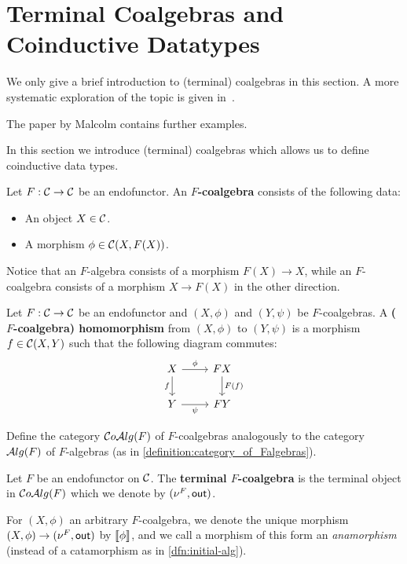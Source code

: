 \chapter{Terminal Coalgebras and Coinductive Datatypes}\label{sec:coinductive}


\begin{reading*}
  We only give a brief introduction to (terminal) coalgebras in this section.
  A more systematic exploration of the topic is given in~\cite{DBLP:conf/fpca/MeijerFP91}.

  The paper \cite{DBLP:journals/scp/Malcolm90} by Malcolm contains further examples.
\end{reading*}


In this section we introduce (terminal) coalgebras which allows us to define coinductive data types.

\begin{dfn} Let $F:\mathcal{C}\to \mathcal{C}$ be an endofunctor. An \textbf{$F$-coalgebra} consists of the following data:
\begin{itemize}
\item An object $X\in \mathcal{C}$.
\item A morphism $\phi \in {\mathcal{C}}(X,F(X))$.
\end{itemize}
\end{dfn}
Notice that an $F$-algebra consists of a morphism $F(X)\to X$, while an $F$-coalgebra consists of a morphism $X\to F(X)$ in the other direction.

\begin{dfn} Let $F:\mathcal{C}\to \mathcal{C}$ be an endofunctor and $(X,\phi)$ and $(Y,\psi)$ be $F$-coalgebras. A \textbf{($F$-coalgebra) homomorphism} from $(X,\phi)$ to $(Y,\psi)$ is a morphism $f\in {\mathcal{C}}(X,Y)$ such that the following diagram commutes:
\[
\begin{tikzcd}
X
\arrow[r, "\phi"] 
\arrow[d,swap, "f"]
& FX
\arrow[d, "F(f)"] 
\\
Y
\arrow[r, swap, "\psi"] 
& FY
\end{tikzcd}
\]
\end{dfn}

\begin{exer} Define the category $\mathcal{C}o\mathcal{A}lg(F)$ of $F$-coalgebras analogously to the category $\mathcal{A}lg(F)$ of $F$-algebras (as in \cref{definition:category_of_Falgebras}).
\end{exer}

\begin{dfn} Let $F$ be an endofunctor on $\mathcal{C}$. The \textbf{terminal $F$-coalgebra} is the terminal object in $\mathcal{C}o\mathcal{A}lg(F)$ which we denote by $(\nu^{F}, \mathsf{out})$.
  
For $(X,\phi)$ an arbitrary $F$-coalgebra, we denote the unique morphism $(X,\phi) \to (\nu^{F}, \mathsf{out})$ by $\llbracket \phi \rrbracket$, and we call a morphism of this form an \textit{anamorphism} (instead of a catamorphism as in \cref{dfn:initial-alg}).
\end{dfn}

